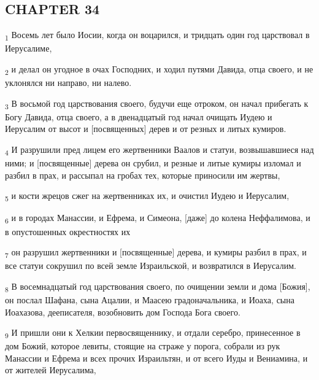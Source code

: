 \subsection{CHAPTER 34}
\begin{tcolorbox}
\textsubscript{1} Восемь лет было Иосии, когда он воцарился, и тридцать один год царствовал в Иерусалиме,
\end{tcolorbox}
\begin{tcolorbox}
\textsubscript{2} и делал он угодное в очах Господних, и ходил путями Давида, отца своего, и не уклонялся ни направо, ни налево.
\end{tcolorbox}
\begin{tcolorbox}
\textsubscript{3} В восьмой год царствования своего, будучи еще отроком, он начал прибегать к Богу Давида, отца своего, а в двенадцатый год начал очищать Иудею и Иерусалим от высот и [посвященных] дерев и от резных и литых кумиров.
\end{tcolorbox}
\begin{tcolorbox}
\textsubscript{4} И разрушили пред лицем его жертвенники Ваалов и статуи, возвышавшиеся над ними; и [посвященные] дерева он срубил, и резные и литые кумиры изломал и разбил в прах, и рассыпал на гробах тех, которые приносили им жертвы,
\end{tcolorbox}
\begin{tcolorbox}
\textsubscript{5} и кости жрецов сжег на жертвенниках их, и очистил Иудею и Иерусалим,
\end{tcolorbox}
\begin{tcolorbox}
\textsubscript{6} и в городах Манассии, и Ефрема, и Симеона, [даже] до колена Неффалимова, и в опустошенных окрестностях их
\end{tcolorbox}
\begin{tcolorbox}
\textsubscript{7} он разрушил жертвенники и [посвященные] дерева, и кумиры разбил в прах, и все статуи сокрушил по всей земле Израильской, и возвратился в Иерусалим.
\end{tcolorbox}
\begin{tcolorbox}
\textsubscript{8} В восемнадцатый год царствования своего, по очищении земли и дома [Божия], он послал Шафана, сына Ацалии, и Маасею градоначальника, и Иоаха, сына Иоахазова, дееписателя, возобновить дом Господа Бога своего.
\end{tcolorbox}
\begin{tcolorbox}
\textsubscript{9} И пришли они к Хелкии первосвященнику, и отдали серебро, принесенное в дом Божий, которое левиты, стоящие на страже у порога, собрали из рук Манассии и Ефрема и всех прочих Израильтян, и от всего Иуды и Вениамина, и от жителей Иерусалима,
\end{tcolorbox}
